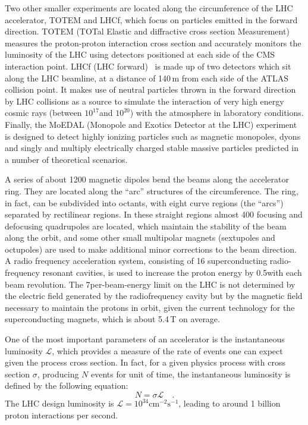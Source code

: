 Two other smaller experiments are located along the circumference of the LHC accelerator, TOTEM and LHCf, which focus on particles emitted in the forward direction. TOTEM (TOTal Elastic and diffractive cross section Measurement)~\cite{Anelli:2008zza} measures the proton-proton interaction cross section and accurately monitors the luminosity of the LHC using detectors positioned at each side of the CMS interaction point. LHCf (LHC forward)~\cite{Adriani:2008zz} is made up of two detectors which sit along the LHC beamline, at a distance of 140\,m from each side of the ATLAS collision point. It makes use of neutral particles thrown in the forward direction by LHC collisions as a source to simulate the interaction of very high energy cosmic rays (between $10^{17}$\TeV and $10^{20}$\TeV) with the atmosphere in laboratory conditions. Finally, the MoEDAL (Monopole and Exotics Detector at the LHC) experiment~\cite{Pinfold:2009oia} is designed to detect highly ionizing particles such as magnetic monopoles, dyons and singly and multiply electrically charged stable massive particles predicted in a number of theoretical scenarios.

A series of about 1200 magnetic dipoles bend the beams along the accelerator ring. They are located along the ``arc'' structures of the circumference. The ring, in fact, can be subdivided into octants, with eight curve regions (the ``arcs'') separated by rectilinear regions. In these straight regions almost 400 focusing and defocusing quadrupoles are located, which maintain the stability of the beam along the orbit, and some other small multipolar magnets (sextupoles and octupoles) are used to make additional minor corrections to the beam direction. A radio frequency acceleration system, consisting of 16 superconducting radio-frequency resonant cavities, is used to increase the proton energy by 0.5\MeV with each beam revolution. The 7\TeV per-beam-energy limit on the LHC is not determined by the electric field generated by the radiofrequency cavity but by the magnetic field necessary to maintain the protons in orbit, given the current technology for the superconducting magnets, which is about 5.4\,T on average.

One of the most important parameters of an accelerator is the instantaneous luminosity $\mathcal{L}$, which provides a measure of the rate of events one can expect given the process cross section. In fact, for a given physics process with cross section $\sigma$, producing $N$ events for unit of time, the instantaneous luminosity is defined by the following equation:
\begin{equation}
N = \sigma\mathcal{L} \quad .
\end{equation}
The LHC design luminosity is $\mathcal{L} = 10^{34} \mathrm{cm^{-2} s^{-1}}$, leading to around 1 billion proton interactions per second.

